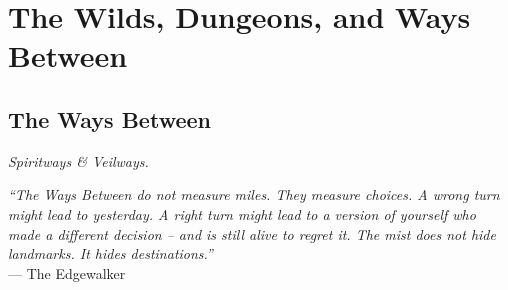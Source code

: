 \documentclass[12pt,oneside]{book}
\begin{document}


\part{The Wilds, Dungeons, and Ways Between}

\chapter{The Ways Between}
\emph{Spiritways \& Veilways.}

\noindent
\textit{``The Ways Between do not measure miles. They measure choices. A wrong turn might lead to yesterday. A right turn might lead to a version of yourself who made a different decision -- and is still alive to regret it. The mist does not hide landmarks. It hides destinations.''} \\
--- The Edgewalker
\end{document}
